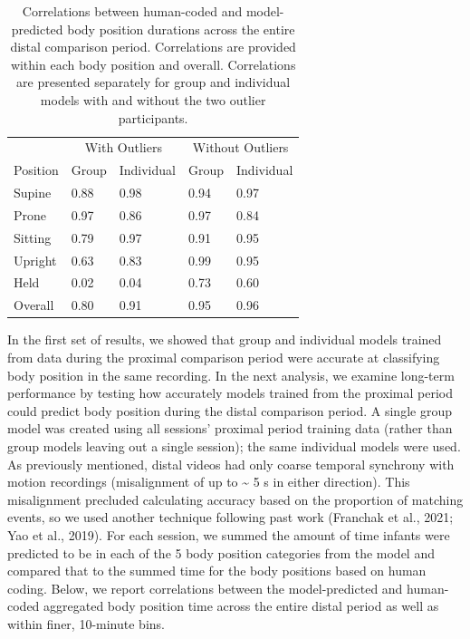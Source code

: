 \documentclass[
  man]{apa6}
\begin{document}
\begin{table}[tbp]

\begin{center}
\begin{threeparttable}

\caption{\label{tab:pt2overalltable}Correlations between human-coded and model-predicted body position durations across the entire distal comparison period. Correlations are provided within each body position and overall. Correlations are presented separately for group and individual models with and without the two outlier participants.}

\begin{tabular}{lllll}
\toprule
 & \multicolumn{2}{c}{With Outliers} & \multicolumn{2}{c}{Without Outliers} \\
\cmidrule(r){2-3} \cmidrule(r){4-5}
Position & Group & Individual & Group & Individual\\
\midrule
Supine & 0.88 & 0.98 & 0.94 & 0.97\\
Prone & 0.97 & 0.86 & 0.97 & 0.84\\
Sitting & 0.79 & 0.97 & 0.91 & 0.95\\
Upright & 0.63 & 0.83 & 0.99 & 0.95\\
Held & 0.02 & 0.04 & 0.73 & 0.60\\ \midrule
Overall & 0.80 & 0.91 & 0.95 & 0.96\\
\bottomrule
\end{tabular}

\end{threeparttable}
\end{center}

\end{table}

In the first set of results, we showed that group and individual models trained from data during the proximal comparison period were accurate at classifying body position in the same recording. In the next analysis, we examine long-term performance by testing how accurately models trained from the proximal period could predict body position during the distal comparison period. A single group model was created using all sessions' proximal period training data (rather than group models leaving out a single session); the same individual models were used. As previously mentioned, distal videos had only coarse temporal synchrony with motion recordings (misalignment of up to \textasciitilde{} 5 s in either direction). This misalignment precluded calculating accuracy based on the proportion of matching events, so we used another technique following past work (Franchak et al., 2021; Yao et al., 2019). For each session, we summed the amount of time infants were predicted to be in each of the 5 body position categories from the model and compared that to the summed time for the body positions based on human coding. Below, we report correlations between the model-predicted and human-coded aggregated body position time across the entire distal period as well as within finer, 10-minute bins.
\end{document}
